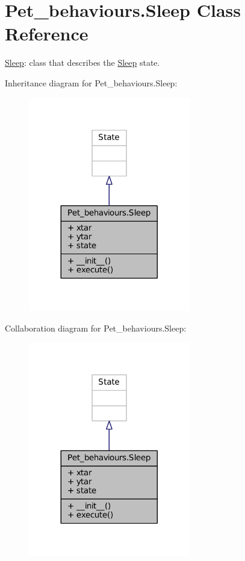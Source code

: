 \hypertarget{classPet__behaviours_1_1Sleep}{}\section{Pet\+\_\+behaviours.\+Sleep Class Reference}
\label{classPet__behaviours_1_1Sleep}


\hyperlink{classPet__behaviours_1_1Sleep}{Sleep}\+: class that describes the \hyperlink{classPet__behaviours_1_1Sleep}{Sleep} state.  




Inheritance diagram for Pet\+\_\+behaviours.\+Sleep\+:\nopagebreak
\begin{figure}[H]
\begin{center}
\leavevmode
\includegraphics[width=200pt]{classPet__behaviours_1_1Sleep__inherit__graph}
\end{center}
\end{figure}


Collaboration diagram for Pet\+\_\+behaviours.\+Sleep\+:\nopagebreak
\begin{figure}[H]
\begin{center}
\leavevmode
\includegraphics[width=200pt]{classPet__behaviours_1_1Sleep__coll__graph}
\end{center}
\end{figure}

